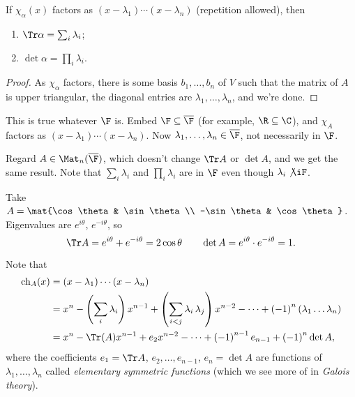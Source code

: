 \begin{proposition}
	If $\chi_\alpha(x)$ factors as $\left( x-\lambda_1 \right) \cdots \left( x-\lambda_n \right)$ (repetition allowed), then %
	\begin{enumerate}
		\shortskip
		\item $\Tr \alpha = \sum_i \lambda_i$;
		\item $\det\alpha = \prod_i \lambda_i$.
	\end{enumerate}
\end{proposition}

\begin{proof}
	As $\chi_\alpha$ factors, there is some basis $b_1,\ldots,b_n$ of $V$ such that the matrix of $A$ is upper triangular, the diagonal entries are $\lambda_1,\ldots,\lambda_n$, and we're done. %
\end{proof}

\begin{remark}
	This is true whatever $\F$ is. Embed $\F\subseteq\overline{\F}$ (for example, $\R\subseteq\C$), and $\chi_A$ factors as $\left( x-\lambda_1 \right) \cdots \left( x-\lambda_n \right)$. Now $\lambda_1,\ldots,\lambda_n \in \overline{\F}$, not necessarily in $\F$. %
	
	Regard $A\in\Mat_n(\overline{\F})$, which doesn't change $\Tr A$ or $\det A$, and we get the same result. Note that $\sum_i \lambda_i$ and $\prod_i \lambda_i$ are in $\F$ even though $\lambda_i\not\iF$. %
\end{remark}

\begin{example}
	Take $A=\mat{\cos\theta & \sin\theta \\ -\sin\theta & \cos\theta}$. Eigenvalues are $e^{i\theta}$, $e^{-i\theta}$, so %
	\begin{equation*}
		\Tr A = e^{i\theta}+e^{-i\theta} = 2\cos\theta
		\qquad
		\det A = e^{i\theta} \cdot e^{-i\theta} = 1.
	\end{equation*}
\end{example}

	Note that
	\begin{align*}
		   \chi_A(x)
		&= \left( x-\lambda_1 \right) \cdots \left( x-\lambda_n \right) \\
		&= x^n - \left( \sum_i \lambda_i \right) x^{n-1} + \left( \sum_{i<j} \lambda_i\,\lambda_j \right) x^{n-2} - \cdots + \left( -1 \right)^n \left( \lambda_1\ldots\lambda_n \right) \\ %
		&= x^n - \Tr(A) x^{n-1} + e_2 x^{n-2} - \cdots  + \left( -1 \right)^{n-1} e_{n-1} + \left( -1 \right)^n \det A, %
	\end{align*}
	where the coefficients $e_1=\Tr A$, $e_2,\ldots,e_{n-1}$, $e_n=\det A$ are functions of $\lambda_1,\ldots,\lambda_n$ called \emph{elementary symmetric functions} (which we see more of in \emph{Galois theory}). %
	
